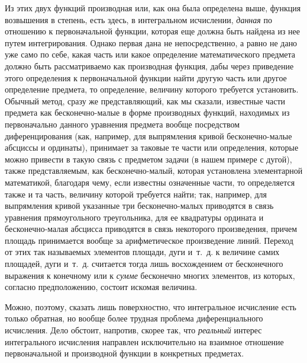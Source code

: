 {Из этих двух функций производная или, как она была определена выше, функция
возвышения в степень, есть здесь, в интегральном исчислении,
{\em данная} по отношению к первоначальной функции,
которая еще должна быть найдена из нее путем интегрирования. Однако первая
дана не непосредственно, а равно не дано уже само по себе, какая часть или
какое определение математического предмета должно быть рассматриваемо как
производная функция, дабы через приведение этого определения к
первоначальной функции найти другую часть или другое определение предмета,
то определение, величину которого требуется установить. Обычный метод,
сразу же представляющий, как мы сказали, известные части предмета как
бесконечно-малые в форме производных функций, находимых из первоначально
данного уравнения предмета вообще посредством диференцирования (как,
например, для выпрямления кривой бесконечно-малые абсциссы и ординаты),
принимает за таковые те части или определения, которые можно привести в
такую связь с предметом задачи (в нашем примере с дугой), также
представляемым, как бесконечно-малый, которая установлена элементарной
математикой, благодаря чему, если известны означенные части, то
определяется также и та часть, величину которой требуется найти; так,
например, для выпрямления кривой указанные три бесконечно-малых приводятся
в связь уравнения прямоугольного треугольника, для ее квадратуры ордината и
бесконечно-малая абсцисса приводятся в связь некоторого произведения,
причем площадь принимается вообще за арифметическое произведение линий.
Переход от этих так называемых элементов площади, дуги и~т.~д. к величине
самих площадей, дуги и~т.~д. считается тогда лишь восхождением от
бесконечного выражения к конечному или к {\em сумме}
бесконечно многих элементов, из которых, согласно предположению, состоит
искомая величина.

Можно, поэтому, сказать лишь поверхностно, что интегральное исчисление есть
только обратная, но вообще более трудная проблема диференциального
исчисления. Дело обстоит, напротив, скорее так, что
{\em реальный} интерес интегрального исчисления
направлен исключительно на взаимное отношение первоначальной и производной
функции в конкретных предметах.

}
